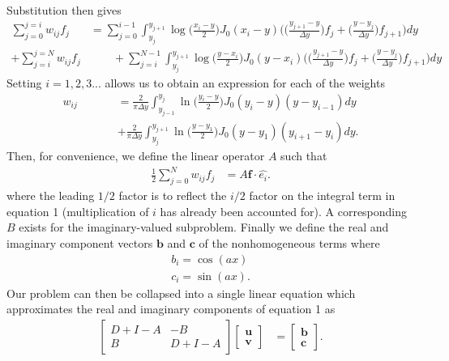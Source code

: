\documentclass[10pt]{article}
\renewcommand{\vec}[1]{\boldsymbol{#1}}
\begin{document}
Substitution then gives
\begin{align}
    \sum_{j=0}^{j=i} w_{ij} f_j &= \sum_{j=0}^{i-1} \int_{y_{j}}^{y_{j+1}} \log \Big( \frac{x_i - y}{2} \Big) J_0(x_i - y) \Big( \Big(\frac{y_{j+1} - y}{\Delta y}\Big)f_j + \Big( \frac{y - y_{j}}{\Delta y} \Big)f_{j+1} \Big) dy \\
    + \sum_{j=i}^{j=N} w_{ij} f_j &\qquad + \sum_{j=i}^{N-1} \int_{y_j}^{y_{j+1}} \log \Big( \frac{y - x_i}{2} \Big) J_0(y - x_i) \Big( \Big(\frac{y_{j+1} - y}{\Delta y}\Big)f_j + \Big( \frac{y - y_{j}}{\Delta y} \Big)f_{j+1} \Big) dy
\end{align}
Setting $i=1,2,3...$ allows us to obtain an expression for each of the weights
\begin{align}
    w_{ij} &= \frac{2}{\pi \Delta y} \int_{y_{j-1}}^{y_j} \ln \Big( \frac{y_i - y}{2} \Big) J_0(y_i - y) (y - y_{i-1})dy \\
    \qquad \qquad &+ \frac{2}{\pi \Delta y} \int_{y_{j}}^{y_{j+1}} \ln \Big( \frac{y - y_1}{2} \Big) J_0(y - y_1) (y_{i+1} - y_i)dy.
\end{align}
Then, for convenience, we define the linear operator $A$ such that
\begin{align}
    \frac{1}{2}\sum_{j=0}^N w_{ij} f_j &= A \vec{f} \cdot \hat{e_i}.
\end{align}
where the leading $1/2$ factor is to reflect the $i/2$ factor on the integral term in equation 1 (multiplication of $i$ has already been accounted for).
A corresponding $B$ exists for the imaginary-valued subproblem.
Finally we define the real and imaginary component vectors $\vec{b}$ and $\vec{c}$ of the nonhomogeneous terms where
\begin{align}
    b_i = \cos(ax) \\
    c_i = \sin(ax).
\end{align}
Our problem can then be collapsed into a single linear equation which approximates the real and imaginary components of equation 1 as
\begin{align}
    \begin{bmatrix}
        D + I - A & -B \\
        B & D + I - A
    \end{bmatrix}
    \begin{bmatrix}
        \vec{u} \\ \vec{v}
    \end{bmatrix}
    &= \begin{bmatrix} \vec{b} \\ \vec{c} \end{bmatrix}.
\end{align}
\end{document}
